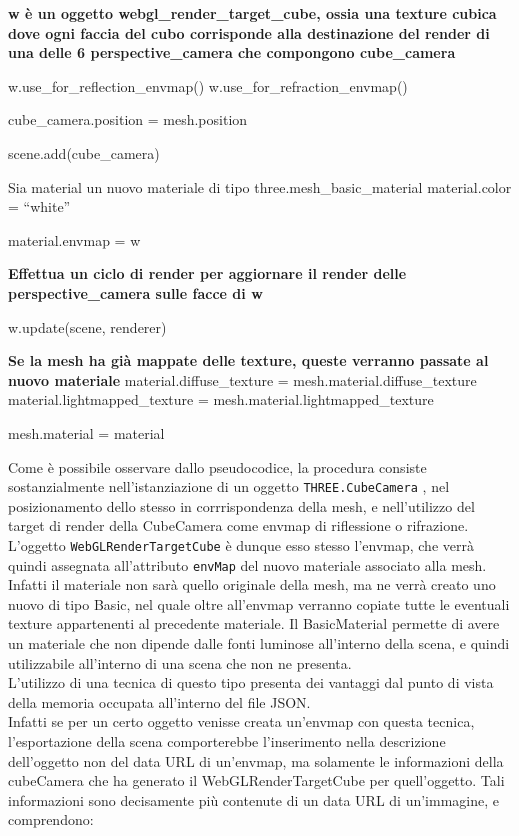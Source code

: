 \begin{algorithm}[H]
\textbf{w è un oggetto webgl\_render\_target\_cube, ossia una texture cubica dove ogni faccia del cubo corrisponde alla destinazione del render di una delle 6 perspective\_camera che compongono cube\_camera}\;

 {
	w.use\_for\_reflection\_envmap()\;
}
 {
	w.use\_for\_refraction\_envmap()\;	
}

cube\_camera.position = mesh.position\;

scene.add(cube\_camera)\;

Sia material un nuovo materiale di tipo three.mesh\_basic\_material\;
material.color = “white”\;

material.envmap = w\;

\textbf{Effettua un ciclo di render per aggiornare il render delle perspective\_camera sulle facce di w}\;

w.update(scene, renderer)\;

\textbf{Se la mesh ha già mappate delle texture,
queste verranno passate al nuovo materiale}\;
material.diffuse\_texture = mesh.material.diffuse\_texture\;
material.lightmapped\_texture = mesh.material.lightmapped\_texture\;

mesh.material = material\;

\end{algorithm}
\newpage
Come è possibile osservare dallo pseudocodice, la procedura consiste sostanzialmente nell’istanziazione di un oggetto \texttt{THREE.CubeCamera} , nel posizionamento dello stesso in corrrispondenza della mesh, e nell’utilizzo del target di render della CubeCamera come envmap di riflessione o rifrazione. L’oggetto \texttt{WebGLRenderTargetCube} è dunque esso stesso l’envmap, che verrà quindi assegnata all’attributo \texttt{envMap} del nuovo materiale associato alla mesh.
\\
Infatti il materiale non sarà quello originale della mesh, ma ne verrà creato uno nuovo di tipo Basic, nel quale oltre all’envmap verranno copiate tutte le eventuali texture appartenenti al precedente materiale. Il BasicMaterial permette di avere un materiale che non dipende dalle fonti luminose all’interno della scena, e quindi utilizzabile all’interno di una scena che non ne presenta.
\\ 
L’utilizzo di una tecnica di questo tipo presenta dei vantaggi dal punto di vista della memoria occupata all’interno del file JSON.
\\ 
Infatti se per un certo oggetto venisse creata un’envmap con questa tecnica, l’esportazione della scena comporterebbe l’inserimento nella descrizione dell’oggetto non del data URL di un’envmap, ma solamente le informazioni della cubeCamera che ha generato il WebGLRenderTargetCube per quell’oggetto. Tali informazioni sono decisamente più contenute di un data URL di un’immagine, e comprendono:
